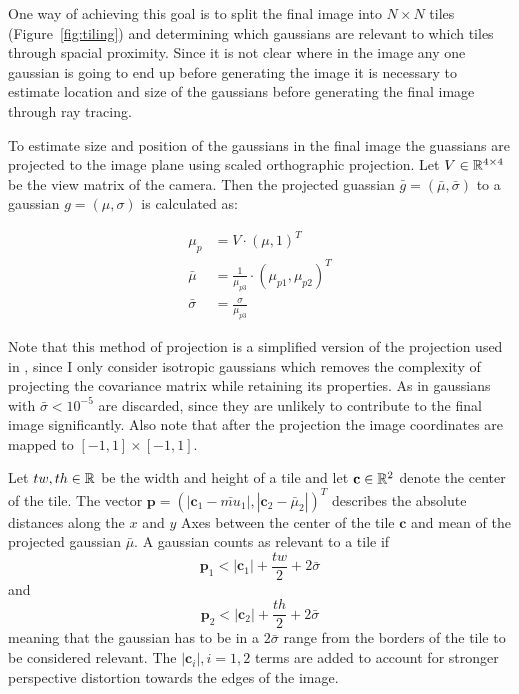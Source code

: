 \documentclass[a4paper, 11pt]{memoir}
\begin{document}
    One way of achieving this goal is to split the final image into $N \times N$ tiles (\eg Figure~\ref{fig:tiling}) and determining which gaussians
    are relevant to which tiles through spacial proximity. Since it is not clear where in the image any one gaussian is
    going to end up before generating the image it is necessary to estimate location and size of the gaussians before
    generating the final image through ray tracing.

    To estimate size and position of the gaussians in the final image the guassians are projected to the image plane using
    scaled orthographic projection. Let $V \in \mathbb{R}^{4 \times 4}$ be the view matrix of the camera. Then the projected guassian
    $\bar{g} = (\bar{\mu}, \bar{\sigma})$ to a gaussian $g = (\mu, \sigma)$ is calculated as:

    \begin{align}
        \mu_p &= V \cdot (\mu, 1)^T\\
        \bar{\mu} &= \frac{1}{\mu_{p3}} \cdot (\mu_{p1}, \mu_{p2})^T\\
        \bar{\sigma} &= \frac{\sigma}{\mu_{p3}}
    \end{align}

    Note that this method of projection is a simplified version of the projection used in \cite{kerbl3Dgaussians}, since I only consider isotropic gaussians which removes
    the complexity of projecting the covariance matrix while retaining its properties.
    As in \cite{Rhodin:2015} gaussians with $\bar{\sigma} < 10^{-5}$ are discarded, since they are unlikely to contribute to the final image significantly.
    Also note that after the projection the image coordinates are mapped to $[-1, 1] \times [-1, 1]$.

    Let $tw, th \in \mathbb{R}$ be the width and height of a tile and let $\mathbf{c} \in \mathbb{R}^2$ denote the center of the tile. The vector $\mathbf{p} = (|\mathbf{c}_1 - \bar{mu}_1|, |\mathbf{c}_2 - \bar{\mu}_2|)^T$
    describes the absolute distances along the $x$ and $y$ Axes between the center of the tile $\mathbf{c}$ and mean of the projected gaussian $\bar{\mu}$.
    A gaussian counts as relevant to a tile if
    \begin{equation}
        \mathbf{p}_1 < |\mathbf{c}_1| + \frac{tw}{2} + 2\bar{\sigma}
    \end{equation}
    and 
    \begin{equation}
        \mathbf{p}_2 < |\mathbf{c}_2| + \frac{th}{2} + 2\bar{\sigma}
    \end{equation}
    meaning that the gaussian has to be in a $2\bar{\sigma}$ range from the borders of the tile to be considered relevant.
    The $|\mathbf{c}_i|, i=1,2$ terms are added to account for stronger perspective distortion towards the edges of the image.
\end{document}
